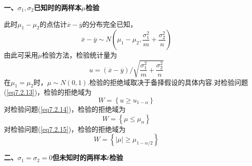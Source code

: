 \textbf{一、$\sigma_{1},\sigma_{2}$已知时的两样本$\mu$检验}

此时$\mu_{ 1 }-\mu_{ 2 }$的点估计$\overline{ x}-\overline{y}$的分布完全已知，
\[\overline { x } - \overline { y } \sim N \left( \mu _ { 1 } - \mu _ { 2 } , \frac { \sigma _ { 1 } ^ { 2 } } { m } + \frac { \sigma _ { 2 } ^ { 2 } } { n } \right)\]
由此可采用$\mu$检验方法，检验统计量为
\[u = ( \overline { x } - \overline { y } ) / \sqrt { \frac { \sigma _ { 1 } ^ { 2 } } { m } + \frac { \sigma _ { 2 } ^ { 2 } } { n } }\]
在$\mu_{ 1 }=\mu_{ 2 }$时，$\mu\sim N(0,1)$.检验的拒绝域取决于备择假设的具体内容.对检验问题(\ref{eq7.2.13})，检验的拒绝域为
\begin{equation}\label{eq7.2.16}
W=\left\{u\geq u_{1-\alpha}\right\}
\end{equation}
对检验问题(\ref{eq7.2.14})，检验的拒绝域为
\begin{equation}\label{eq7.2.17}
W=\left\{\mu\leq\mu_{\alpha}\right\}
\end{equation}
对检验问题(\ref{eq7.2.15})，检验的拒绝域为
\begin{equation}\label{eq7.2.18}
W=\left\{\left|\mu\right|\geq\mu_{1-\alpha/2}\right\}
\end{equation}

\textbf{二、$\sigma_{1}=\sigma_{ 2 }=0$但未知时的两样本$t$检验}

